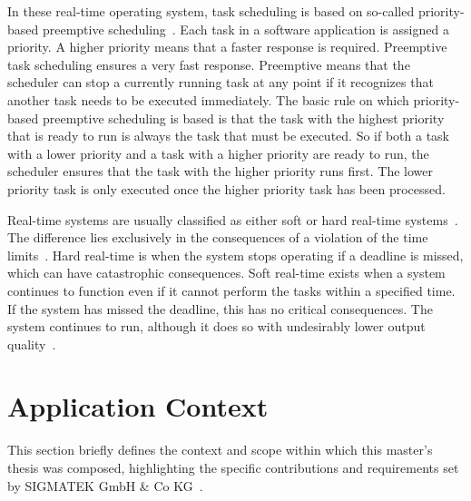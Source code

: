\documentclass[MMR,Master,english]{twbook}
\begin{document}
\noindent In these real-time operating system, task scheduling is based on so-called priority-based preemptive scheduling~\cite{buttazzoHardRealtimeComputing2024}. Each task in a software application is assigned a priority. A higher priority means that a faster response is required. Preemptive task scheduling ensures a very fast response. Preemptive means that the scheduler can stop a currently running task at any point if it recognizes that another task needs to be executed immediately. The basic rule on which priority-based preemptive scheduling is based is that the task with the highest priority that is ready to run is always the task that must be executed. So if both a task with a lower priority and a task with a higher priority are ready to run, the scheduler ensures that the task with the higher priority runs first. The lower priority task is only executed once the higher priority task has been processed.

\bigskip \noindent Real-time systems are usually classified as either soft or hard real-time systems~\cite{lipariRealTimeSchedulingHard2015}. The difference lies exclusively in the consequences of a violation of the time limits~\cite{amarpreetHardRealTime2009}. Hard real-time is when the system stops operating if a deadline is missed, which can have catastrophic consequences. Soft real-time exists when a system continues to function even if it cannot perform the tasks within a specified time. If the system has missed the deadline, this has no critical consequences. The system continues to run, although it does so with undesirably lower output quality~\cite{queirozTestingLimitsGeneralpurpose2023}.

\section{Application Context}\label{sec:application_context}
This section briefly defines the context and scope within which this master's thesis was composed, highlighting the specific contributions and requirements set by SIGMATEK GmbH \& Co KG~\cite{pixelartSIGMATEKKompletteAutomatisierungssysteme}.
\end{document}
